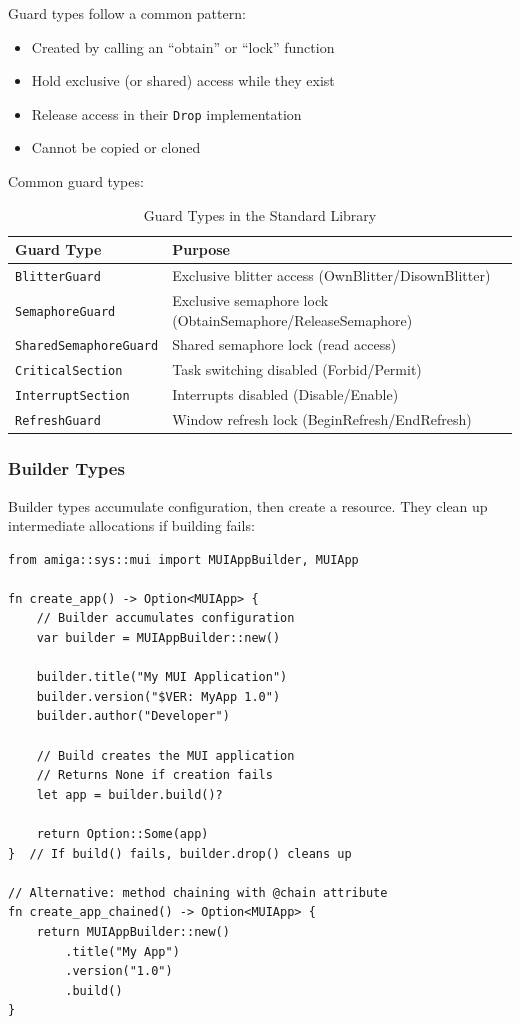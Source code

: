 Guard types follow a common pattern:
\begin{itemize}
    \item Created by calling an ``obtain'' or ``lock'' function
    \item Hold exclusive (or shared) access while they exist
    \item Release access in their \texttt{Drop} implementation
    \item Cannot be copied or cloned
\end{itemize}

Common guard types:

\begin{table}[h]
\centering
\begin{tabular}{lp{8cm}}
\hline
\textbf{Guard Type} & \textbf{Purpose} \\
\hline
\texttt{BlitterGuard} & Exclusive blitter access (OwnBlitter/DisownBlitter) \\
\texttt{SemaphoreGuard} & Exclusive semaphore lock (ObtainSemaphore/ReleaseSemaphore) \\
\texttt{SharedSemaphoreGuard} & Shared semaphore lock (read access) \\
\texttt{CriticalSection} & Task switching disabled (Forbid/Permit) \\
\texttt{InterruptSection} & Interrupts disabled (Disable/Enable) \\
\texttt{RefreshGuard} & Window refresh lock (BeginRefresh/EndRefresh) \\
\hline
\end{tabular}
\caption{Guard Types in the Standard Library}
\end{table}

\subsubsection{Builder Types}

Builder types accumulate configuration, then create a resource. They clean up intermediate allocations if building fails:

\begin{lstlisting}
from amiga::sys::mui import MUIAppBuilder, MUIApp

fn create_app() -> Option<MUIApp> {
    // Builder accumulates configuration
    var builder = MUIAppBuilder::new()

    builder.title("My MUI Application")
    builder.version("$VER: MyApp 1.0")
    builder.author("Developer")

    // Build creates the MUI application
    // Returns None if creation fails
    let app = builder.build()?

    return Option::Some(app)
}  // If build() fails, builder.drop() cleans up

// Alternative: method chaining with @chain attribute
fn create_app_chained() -> Option<MUIApp> {
    return MUIAppBuilder::new()
        .title("My App")
        .version("1.0")
        .build()
}
\end{lstlisting}

